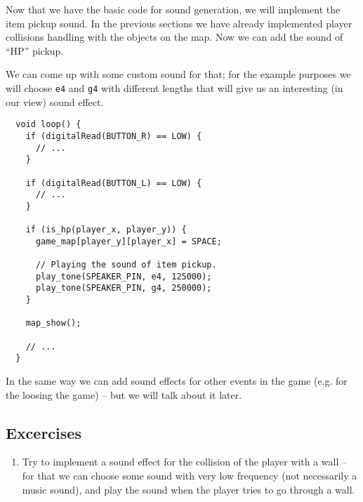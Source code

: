 \documentclass[../sparc.tex]{subfiles}
\begin{document}
Now that we have the basic code for sound generation, we will implement the item
pickup sound.  In the previous sections we have already implemented player
collisions handling with the objects on the map.  Now we can add the sound of
``HP'' pickup.

We can come up with some custom sound for that; for the example purposes we will
choose \texttt{e4} and \texttt{g4} with different lengths that
will give us an interesting (in our view) sound effect.

\begin{verbatim}
  void loop() {
    if (digitalRead(BUTTON_R) == LOW) {
      // ...
    }

    if (digitalRead(BUTTON_L) == LOW) {
      // ...
    }

    if (is_hp(player_x, player_y)) {
      game_map[player_y][player_x] = SPACE;

      // Playing the sound of item pickup.
      play_tone(SPEAKER_PIN, e4, 125000);
      play_tone(SPEAKER_PIN, g4, 250000);
    }

    map_show();

    // ...
  }
\end{verbatim}

In the same way we can add sound effects for other events in the game (e.g. for
the loosing the game) -- but we will talk about it later.

\subsection{Excercises}
\begin{enumerate}
\item Try to implement a sound effect for the collision of the player with a
  wall -- for that we can choose some sound with very low frequency (not
  necessarily a music sound), and play the sound when the player tries to go
  through a wall.
\end{enumerate}
\end{document}
